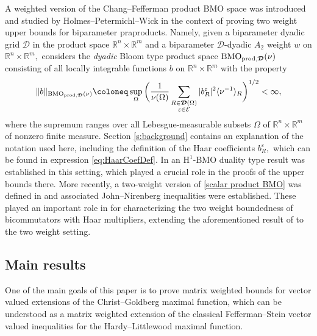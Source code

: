 \documentclass{article}
\theoremstyle{definition}
\theoremstyle{remark}
\numberwithin{equation}{section}
\newcommand{\cE}{\mathcal{E}}
\newcommand{\bfD}{\bm{\mathcal{D}}}
\newcommand{\e}{\varepsilon}
\newcommand{\reals}{\mathbb{R}}
\newcommand{\1}{\mathbf{1}}
\newcommand{\BMOprodD}{\ensuremath\text{BMO}_{\text{prod},\bfD}}
\begin{document}
    A weighted version of the Chang--Fefferman product BMO space was introduced and studied by Holmes--Petermichl--Wick \cite{Holmes_Petermichl_Wick_2018} in the context of proving two weight upper bounds for biparameter praproducts. Namely, given a biparameter dyadic grid $\bfD$ in the product space $\reals^n\times\reals^m$ and a biparameter $\bfD$-dyadic $A_2$ weight $w$ on $\reals^n\times\reals^m,$ \cite{Holmes_Petermichl_Wick_2018} considers the \emph{dyadic} Bloom type product space $\BMOprodD(\nu)$ consisting of all locally integrable functions $b$ on $\reals^n\times\reals^m$ with the property
    \begin{equation}
        \label{scalar product BMO}
        \Vert b \Vert_{\BMOprodD(\nu)} \coloneq  \sup_{\Omega} \bigg( \frac{1}{\nu(\Omega)} \sum_{\substack{R\in\bfD(\Omega)\\\e\in\cE}} |b_R^{\e}|^2 \langle \nu^{-1} \rangle_{R} \bigg)^{1/2}<\infty,
    \end{equation}
    where the supremum ranges over all Lebesgue-measurable subsets $\Omega$ of $\reals^n\times\reals^m$ of nonzero finite measure.
    Section \ref{s:background} contains an explanation of the notation used here,
    including the definition of the Haar coefficients $b_R^{\e},$
    which can be found in expression \eqref{eq:HaarCoefDef}.
    In \cite{Holmes_Petermichl_Wick_2018} an $\mathrm{H}^1$-BMO duality type result was established in this setting, which played a crucial role in the proofs of the upper bounds there. More recently, a two-weight version of \eqref{scalar product BMO} was defined in \cite{Kakaroumpas_Soler_2022} and associated John--Nirenberg inequalities were established. These played an important role in \cite{Kakaroumpas_Soler_2022} for characterizing the two weight boundedness of bicommutators with Haar multipliers, extending the aforementioned result of \cite{Blasco_Pott_2005} to the two weight setting.

    \subsection{Main results}

    One of the main goals of this paper is to prove matrix weighted bounds for vector valued extensions of the Christ--Goldberg maximal function, which can be understood as a matrix weighted extension of the classical Fefferman--Stein vector valued inequalities for the Hardy--Littlewood maximal function.
\end{document}

